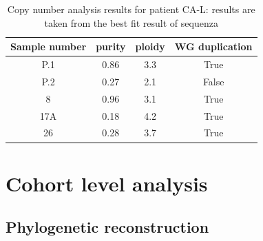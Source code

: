 \begin{table}[ht]
\caption[Copy number analysis results for patient CA-L]{Copy number analysis results for patient CA-L: results are taken from the best fit result of sequenza}\label{tab:ca86cnv}
\centering
{}
\begin{tabular}{|c|c|c|c|}
\toprule
\hline
 \rowcolor{gray!50}
\textbf{Sample number} & \textbf{purity} & \textbf{ploidy} & \textbf{WG duplication}\\
\hline
 P.1 & \num{0.86} &	 \num{3.3}  & True	\\
 P.2 & \num{0.27} & \num{2.1}  & False \\
 8 & \num{0.96} & \num{3.1}  & True \\
 17A & \num{0.18} & \num{4.2}  & True \\
 26 & \num{0.28} & \num{3.7} & True \\
 \hline
\bottomrule
\end{tabular}
\end{table} 


\cleardoublepage

\section{Cohort level analysis}
\label{cascade-sec:cohortLevel}



\subsection{Phylogenetic reconstruction}
\label{cascade-sec:phylocohort}

